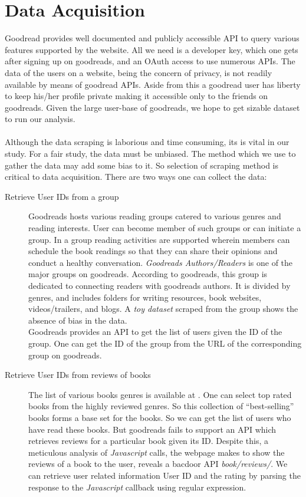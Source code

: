 \documentclass[11pt]{article}
\begin{document}
\section{Data Acquisition}
\label{sec:data_acquisition}
Goodread provides well documented and publicly accessible API to query various features supported by the website. All we need is a developer key, which one gets after signing up on goodreads, and an OAuth access to use numerous APIs. The data of the users on a website, being the concern of privacy, is not readily available by means of goodread APIs. Aside from this a goodread user has liberty to keep his/her profile private making it accessible only to the friends on goodreads. Given the large user-base of goodreads, we hope to get sizable dataset to run our analysis.\\\\
Although the data scraping is laborious and time consuming, its is vital in our study. For a fair study, the data must be unbiased. The method which we use to gather the data may add some bias to it. So selection of scraping method is critical to data acquisition. There are two ways one can collect the data:
\begin{description}
\item[Retrieve User IDs from a group]
Goodreads hosts various reading groups catered to various genres and reading interests. User can become member of such groups or can initiate a group. In a group reading activities are supported wherein members can schedule the book readings so that they can share their opinions and conduct a healthy conversation. {\it Goodreads Authors/Readers} is one of the major groups on goodreads.  According to goodreads, this group is dedicated to connecting readers with goodreads authors. It is divided by genres, and includes folders for writing resources, book websites, videos/trailers, and blogs. A {\it toy dataset} scraped from the group shows the absence of bias in the data.\\
Goodreads provides an API to get the list of users given the ID of the group. One can get the ID of the group from the URL of the corresponding group on goodreads.
\item[Retrieve User IDs from reviews of books]
The list of various books genres is available at \cite{goodreads:genres}. One can select top rated books from the highly reviewed genres. So this collection of ``best-selling'' books forms a base set for the books. So we can get the list of users who have read these books. But goodreads fails to support an API which retrieves reviews for a particular book given its ID. Despite this, a meticulous analysis of \textit{Javascript} calls, the webpage makes to show the reviews of a book to the user, reveals a bacdoor API \textit{book/reviews/}. We can retrieve user related information User ID and the rating by parsing the response to the \textit{Javascript} callback using regular expression.

\end{description}
\end{document}

